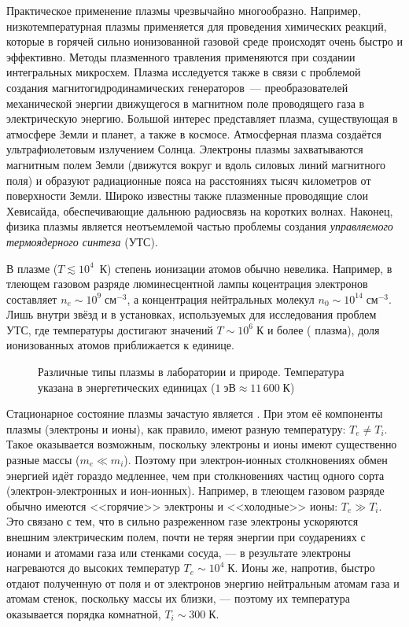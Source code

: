 Практическое применение плазмы чрезвычайно многообразно.
Например, низкотемпературная плазмы применяется 
для проведения химических реакций, которые в горячей
сильно ионизованной газовой среде происходят очень быстро и эффективно.
Методы плазменного травления применяются при создании интегральных
микросхем. Плазма исследуется также в связи с проблемой 
создания магнитогидродинамических генераторов~--- преобразователей
механической энергии движущегося в магнитном поле проводящего газа в
электрическую энергию.
Большой интерес представляет плазма, существующая в атмосфере Земли и планет, а
также в космосе. Атмосферная плазма создаётся ультрафиолетовым излучением
Солнца. Электроны плазмы захватываются магнитным полем Земли (движутся вокруг и
вдоль силовых линий магнитного поля) и образуют радиационные пояса на
расстояниях тысяч километров от поверхности Земли. Широко известны также
плазменные проводящие слои Хевисайда, обеспечивающие дальнюю радиосвязь
на коротких волнах. 
Наконец, физика плазмы является неотъемлемой частью проблемы создания 
\emph{управляемого термоядерного синтеза} (УТС).


В  плазме ($T\lesssim 10^4$~К) степень ионизации 
атомов обычно невелика. Например, в тлеющем газовом разряде 
люминесцентной лампы коцентрация электронов составляет 
$n_e\sim 10^9\;\text{см}^{-3}$,
а концентрация нейтральных молекул $n_0\sim 10^{14}\;\text{см}^{-3}$.
Лишь внутри звёзд и в установках, используемых для исследования проблем 
УТС, где температуры достигают значений $T \sim 10^{6}\;К$ и более
( плазма),
доля ионизованных атомов приближается к единице.

\begin{figure}[ht]
    \centering
    {\footnotesize
    }
    \caption{Различные типы плазмы в лаборатории и природе. Температура
    указана в энергетических единицах ($1\;эВ\approx 11\,600\;К$)}
\end{figure}

Стационарное состояние плазмы зачастую является .
При этом её компоненты плазмы (электроны и ионы), как
правило, имеют разную температуру: $T_e\ne T_i$. 
Такое оказывается возможным, поскольку 
электроны и ионы имеют существенно разные массы ($m_e \ll m_i$).
Поэтому при электрон-ионных столкновениях обмен энергией идёт гораздо медленнее,
чем при столкновениях частиц одного сорта (электрон-электронных и ион-ионных).
Например, в тлеющем газовом разряде обычно имеются 
<<горячие>> электроны и <<холодные>> ионы: $T_e \gg T_i$.
Это связано с тем, что в сильно разреженном газе электроны ускоряются 
внешним электрическим полем, почти не теряя энергии при соударениях 
с ионами и атомами газа или стенками сосуда, --- в результате электроны
нагреваются до высоких температур $T_e\sim 10^4\;К$.
Ионы же, напротив, быстро отдают полученную от поля и от электронов энергию 
нейтральным атомам газа и атомам стенок, поскольку массы их близки, 
--- поэтому их температура оказывается порядка комнатной, $T_i \sim 300\;К$.


